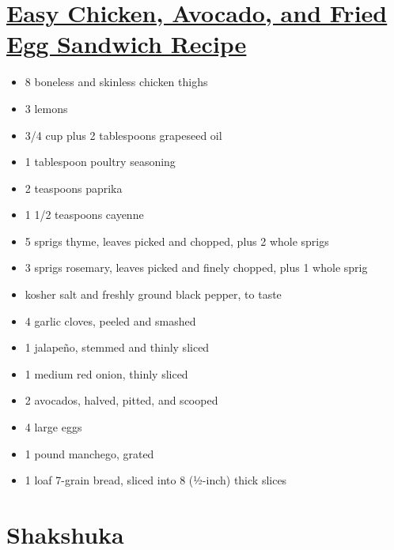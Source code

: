 \documentclass[]{article}
\providecommand{\tightlist}{%
  \setlength{\itemsep}{0pt}\setlength{\parskip}{0pt}}
\begin{document}
\hypertarget{easy-chicken-avocado-and-fried-egg-sandwich-recipe}{%
\section{\texorpdfstring{\href{https://www.vice.com/en_us/article/gyam9j/easy-chicken-avocado-and-fried-egg-sandwich-recipe}{Easy Chicken, Avocado, and Fried Egg Sandwich Recipe}}{Easy Chicken, Avocado, and Fried Egg Sandwich Recipe}}\label{easy-chicken-avocado-and-fried-egg-sandwich-recipe}}

\begin{itemize}
\tightlist
\item
  8 boneless and skinless chicken thighs
\item
  3 lemons
\item
  3/4 cup plus 2 tablespoons grapeseed oil
\item
  1 tablespoon poultry seasoning
\item
  2 teaspoons paprika
\item
  1 1/2 teaspoons cayenne
\item
  5 sprigs thyme, leaves picked and chopped, plus 2 whole sprigs
\item
  3 sprigs rosemary, leaves picked and finely chopped, plus 1 whole sprig
\item
  kosher salt and freshly ground black pepper, to taste
\item
  4 garlic cloves, peeled and smashed
\item
  1 jalapeño, stemmed and thinly sliced
\item
  1 medium red onion, thinly sliced
\item
  2 avocados, halved, pitted, and scooped
\item
  4 large eggs
\item
  1 pound manchego, grated
\item
  1 loaf 7-grain bread, sliced into 8 (½-inch) thick slices
\end{itemize}

\hypertarget{shakshuka}{%
\section{Shakshuka}\label{shakshuka}}
\end{document}
